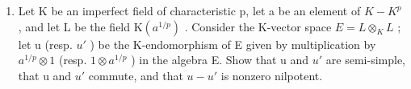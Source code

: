 \begin{enumerate}
\def\labelenumi{\arabic{enumi})}
\setcounter{enumi}{13}
\tightlist
\item
  Let K be an imperfect field of characteristic p, let a be an element of \(K - K^{p}\) , and let L be the field \(\mathrm{K}(a^{1/p})\) . Consider the K-vector space \(E = L \otimes_{K} L\) ; let u (resp. \(u'\) ) be the K-endomorphism of E given by multiplication by \(a^{1/p} \otimes 1\) (resp. \(1 \otimes a^{1/p}\) ) in the algebra E. Show that u and \(u'\) are semi-simple, that u and \(u'\) commute, and that \(u - u'\) is nonzero nilpotent.
\end{enumerate}

